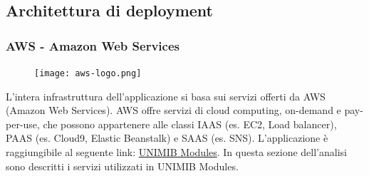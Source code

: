 \documentclass[12pt]{article}
\begin{document}
			\subsection{Architettura di deployment}
			\subsubsection{AWS - Amazon Web Services}
			\begin{figure}[H]
				\texttt{[image: aws-logo.png]}
			\end{figure}
			L'intera infrastruttura dell'applicazione si basa sui servizi offerti da AWS (Amazon Web Services). AWS offre servizi di cloud computing, on-demand e pay-per-use, che possono appartenere alle classi IAAS (es. EC2, Load balancer), PAAS (es. Cloud9, Elastic Beanstalk) e SAAS (es. SNS). L'applicazione è raggiungibile al seguente link: \textcolor{blue}{\href{http://unimibquestionari-env.eba-3behr9mi.eu-central-1.elasticbeanstalk.com/}{UNIMIB Modules}}. In questa sezione dell'analisi sono descritti i servizi utilizzati in UNIMIB Modules. 
\end{document}
